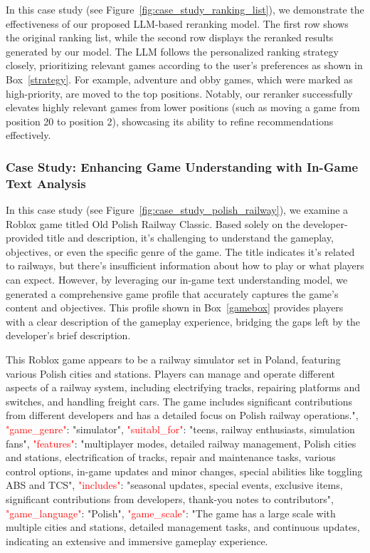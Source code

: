 In this case study (see Figure~\ref{fig:case_study_ranking_list}), we demonstrate the effectiveness of our proposed LLM-based reranking model. The first row shows the original ranking list, while the second row displays the reranked results generated by our model. The LLM follows the personalized ranking strategy closely, prioritizing relevant games according to the user’s preferences as shown in Box~\ref{strategy}. For example, adventure and obby games, which were marked as high-priority, are moved to the top positions. Notably, our reranker successfully elevates highly relevant games from lower positions (such as moving a game from position 20 to position 2), showcasing its ability to refine recommendations effectively.

\subsubsection{Case Study: Enhancing Game Understanding with In-Game Text Analysis} 


In this case study (see Figure~\ref{fig:case_study_polish_railway}), we examine a Roblox game titled Old Polish Railway Classic. Based solely on the developer-provided title and description, it’s challenging to understand the gameplay, objectives, or even the specific genre of the game. The title indicates it’s related to railways, but there’s insufficient information about how to play or what players can expect. However, by leveraging our in-game text understanding model, we generated a comprehensive game profile that accurately captures the game’s content and objectives. This profile shown in Box~\ref{gamebox} provides players with a clear description of the gameplay experience, bridging the gaps left by the developer’s brief description.

\begin{tcolorbox}[colback=gray!5, colframe=gray!80, title=Game Profile about Old Polish Railway Classic, label=gamebox]
This Roblox game appears to be a railway simulator set in Poland, featuring
various Polish cities and stations. Players can manage and operate different aspects of a
railway system, including electrifying tracks, repairing platforms and switches, and handling freight cars. The game includes significant contributions from different developers and has a detailed focus on Polish railway operations.", \textcolor{red}{"game\_genre"}: "simulator",
\textcolor{red}{"suitabl\_for"}: "teens, railway enthusiasts, simulation fans", \textcolor{red}{"features"}: "multiplayer modes, detailed railway management, Polish cities and stations, electrification of tracks, repair and maintenance tasks, various control options, in-game updates and minor changes, special abilities like toggling ABS and TCS", \textcolor{red}{"includes"}: "seasonal updates, special events, exclusive items, significant contributions from developers, thank-you notes to contributors", \textcolor{red}{"game\_language"}: "Polish", \textcolor{red}{"game\_scale"}: "The game has a large scale with multiple cities and stations, detailed management tasks, and continuous updates, indicating an extensive and immersive gameplay experience.
\end{tcolorbox}




